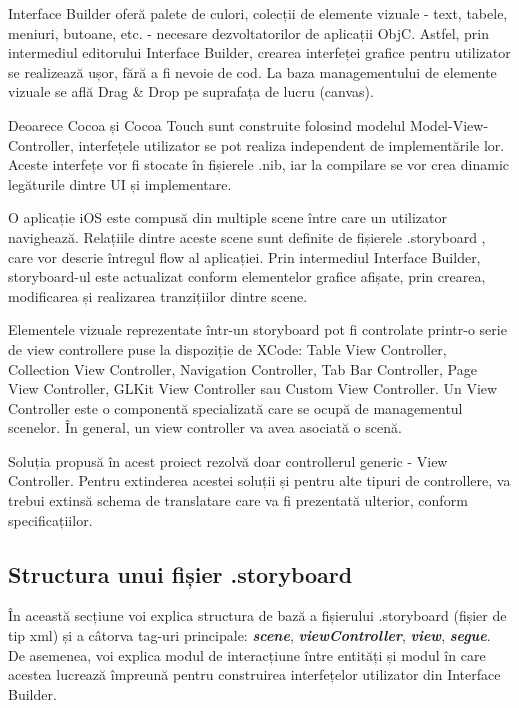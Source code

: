 Interface Builder oferă palete de culori, colecții de elemente vizuale - text, tabele, meniuri, butoane, etc. - necesare dezvoltatorilor de aplicații ObjC. Astfel, prin intermediul editorului Interface Builder, crearea interfeței grafice pentru utilizator se realizează ușor, fără a fi nevoie de cod. La baza managementului de elemente vizuale se află Drag \& Drop pe suprafața de lucru (canvas). 

Deoarece Cocoa și Cocoa Touch sunt construite folosind modelul Model-View-Controller, interfețele utilizator se pot realiza independent de implementările lor. Aceste interfețe vor fi stocate în fișierele .nib, iar la compilare se vor crea dinamic legăturile dintre UI și implementare.

O aplicație iOS este compusă din multiple scene între care un utilizator navighează. Relațiile dintre aceste scene sunt definite de fișierele .storyboard \cite{StructuraXcode}, care vor descrie întregul flow al aplicației. Prin intermediul Interface Builder, storyboard-ul este actualizat conform elementelor grafice afișate, prin crearea, modificarea și realizarea tranzițiilor dintre scene.

Elementele vizuale reprezentate într-un storyboard pot fi controlate printr-o serie de view controllere puse la dispoziție de XCode: Table View Controller, Collection View Controller, Navigation Controller, Tab Bar Controller, Page View Controller, GLKit View Controller sau Custom View Controller. Un View Controller este o componentă specializată care se ocupă de managementul scenelor. În general, un view controller va avea asociată o scenă. 

Soluția propusă în acest proiect rezolvă doar controllerul generic - View Controller. Pentru extinderea acestei soluții și pentru alte tipuri de controllere, va trebui extinsă schema de translatare care va fi prezentată ulterior, conform specificațiilor. 

\subsection{Structura unui fișier .storyboard}

În această secțiune voi explica structura de bază a fișierului .storyboard (fișier de tip xml) și a câtorva tag-uri principale: \textbf{\textit{scene}}, \textbf{\textit{viewController}}, \textbf{\textit{view}}, \textbf{\textit{segue}}. De asemenea, voi explica modul de interacțiune între entități și modul în care acestea lucrează împreună pentru construirea interfețelor utilizator din Interface Builder.


